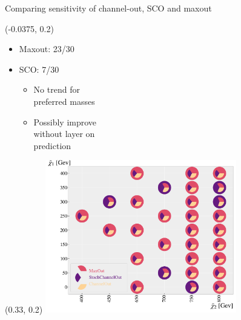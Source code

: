 \documentclass[UKenglish]{beamer}
\begin{document}
\begin{frame}{Comparing sensitivity of channel-out, SCO and maxout}
    \begin{textblock}{1}(-0.0375, 0.2)
        \begin{itemize}
            \item Maxout: 23/30
            \item SCO: 7/30
            \begin{itemize}
                \item No trend for \\
                preferred masses
                \item Possibly improve\\
                      without layer on \\
                      prediction 
            \end{itemize}
        \end{itemize}
    \end{textblock}
    \begin{textblock}{1}(0.33, 0.2)
    \includegraphics[width = 0.625\textwidth]{figures/Comps/EnsemblesNetworkComp.pdf}
    \end{textblock}
\end{frame}
\end{document}
